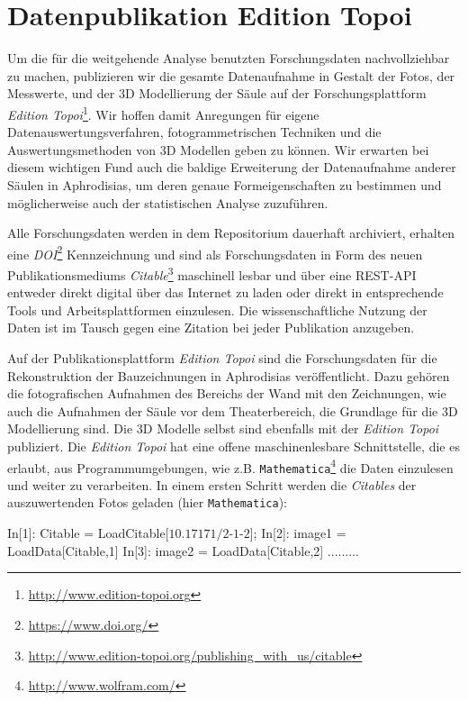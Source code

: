 \documentclass[twocolumn]{bmcart}
\begin{document}
\section{Datenpublikation Edition Topoi}

 Um die für die weitgehende Analyse benutzten Forschungsdaten nachvollziehbar zu machen, publizieren wir die gesamte Datenaufnahme in Gestalt der Fotos, der Messwerte, und der 3D Modellierung der Säule auf der Forschungsplattform \textit{Edition Topoi}\footnote{\href{http://www.edition-topoi.org/}{http://www.edition-topoi.org}}. Wir hoffen damit Anregungen für eigene Datenauswertungsverfahren, fotogrammetrischen Techniken und die Auswertungsmethoden von 3D Modellen geben zu können. Wir erwarten bei diesem wichtigen Fund auch die baldige Erweiterung der Datenaufnahme anderer Säulen in Aphrodisias, um deren genaue Formeigenschaften zu bestimmen und möglicherweise auch der statistischen Analyse zuzuführen.
 
  Alle Forschungsdaten werden in dem Repositorium dauerhaft archiviert, erhalten eine \textit{DOI}\footnote{\href{https://www.doi.org/}{https://www.doi.org/}} Kennzeichnung und sind als Forschungsdaten in Form des neuen Publikationsmediums \textit{Citable}\footnote{\href{http://www.edition-topoi.org/publishing_with_us/citable}{http://www.edition-topoi.org/publishing\_with\_us/citable}} maschinell lesbar und über eine REST-API  entweder direkt digital über das Internet zu laden oder direkt in entsprechende Tools und Arbeitsplattformen einzulesen. Die wissenschaftliche Nutzung der Daten ist im Tausch gegen eine Zitation bei jeder Publikation anzugeben.

Auf der Publikationsplattform \textit{Edition Topoi} sind die Forschungsdaten für die Rekonstruktion der Bauzeichnungen in Aphrodisias veröffentlicht. Dazu gehören die fotografischen Aufnahmen des Bereichs der Wand mit den Zeichnungen, wie auch die Aufnahmen der Säule vor dem Theaterbereich, die Grundlage für die 3D Modellierung sind. Die 3D Modelle selbst sind ebenfalls mit der \textit{Edition Topoi} publiziert. Die \textit{Edition Topoi} hat eine offene maschinenlesbare Schnittstelle, die es erlaubt, aus Programmumgebungen, wie z.B. \texttt{Mathematica}\footnote{\href{http://www.wolfram.com/}{http://www.wolfram.com/}} die Daten einzulesen und weiter zu verarbeiten. In einem ersten Schritt werden die \textit{Citables} der auszuwertenden Fotos geladen (hier \texttt{Mathematica}):


	\begin{shaded}
		\begin{mat}
        In[1]:	Citable = LoadCitable[$\text{10.17171/2-1-2}$];
        In[2]:  image1 = LoadData[Citable,1]
        In[3]:  image2 = LoadData[Citable,2]
		.........
		\end{mat}
	\end{shaded}
\end{document}

